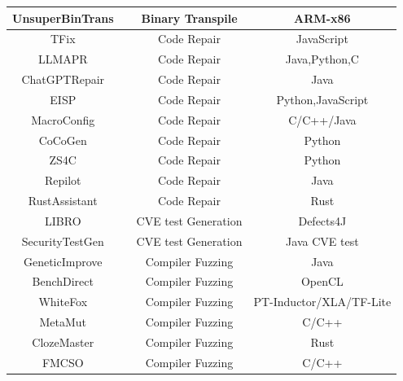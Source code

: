 \documentclass[pdflatex,sn-mathphys-ay,twocolumn, a4paper]{sn-jnl}%
\theoremstyle{thmstyleone}%
\theoremstyle{thmstyletwo}%
\theoremstyle{thmstylethree}%
\begin{document}
\begin{table}
{\begin{tabular}{|c|c|c|c|}
    UnsuperBinTrans & \citet{168_unsupervised2023_emnlp} & Binary Transpile & ARM-x86 \\
    \hline
    TFix & \citet{166_tfix2021_icml} & Code Repair & JavaScript \\
    LLMAPR & \citet{133_xia2023_icse} & Code Repair & Java,Python,C \\
    ChatGPTRepair & \citet{148_zhang2023critical} & Code Repair & Java \\
    EISP & \citet{16_chen2024test} & Code Repair & Python,JavaScript \\
    MacroConfig & \citet{19_albuquerque2024evaluating} & Code Repair & C/C++/Java \\
    CoCoGen & \citet{110_bi-etal-2024-iterative} & Code Repair & Python \\
    ZS4C & \citet{29_kabir2025zs4c} & Code Repair & Python \\
    Repilot & \citet{131_wei2023_fse} & Code Repair & Java \\
    RustAssistant & \citet{113_deligiannis2024rustassistant} & Code Repair & Rust \\

    LIBRO & \citet{150_kang2023large} & CVE test Generation & Defects4J \\
    SecurityTestGen & \citet{144_zhang2023doesllmgeneratesecurity} & CVE test Generation & Java CVE test \\
    GeneticImprove & \citet{147_brownlee2023enhancing} & Compiler Fuzzing & Java \\
    BenchDirect & \citet{139_tsimpourlas2023benchdirectdirectedlanguagemodel} & Compiler Fuzzing & OpenCL \\
    WhiteFox & \citet{31_yang2024whitefox} & Compiler Fuzzing & PT-Inductor/XLA/TF-Lite \\
    MetaMut & \citet{76_ou2024mutators_asplos} & Compiler Fuzzing & C/C++ \\
    ClozeMaster & \citet{53_gao2025clozemaster} & Compiler Fuzzing & Rust \\
    FMCSO & \citet{14_italiano2025finding} & Compiler Fuzzing & C/C++ \\
    

\end{tabular}}
\end{table}
\end{document}
